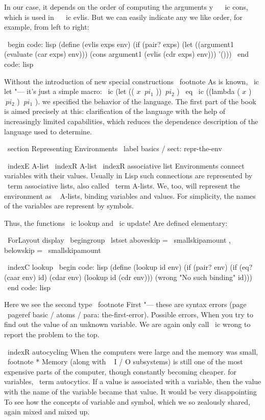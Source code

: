 {In our case, it depends on the order of computing the arguments y ~ \ ic {cons}, which
is used in ~ \ ic {evlis}. But we can easily indicate any we like
order, for example, from left to right:

\ begin {code: lisp}
(define (evlis exps env)
  (if (pair? exps)
      (let ((argument1 (evaluate (car exps) env)))
        (cons argument1 (evlis (cdr exps) env)))
      '()))
\ end {code: lisp}

Without the introduction of new special constructions \ footnote {As is known, \ ic {let} "---
it's just a simple macro: \ ic {(let (( $ x $  $ \ pi _ 1 $ )) $ \ pi _ 2 $ )} { \ eq }
\ ic {((lambda ( $ x $ ) $ \ pi _ 2 $ ) $ \ pi _ 1 $ )}.} we specified the behavior of the
language. The first part of the book is aimed precisely at this: clarification of the
language with the help of increasingly limited capabilities, which reduces the dependence
description of the language used to determine.


\ section {Representing Environments} \ label {basics / sect: repr-the-env}

\ indexE {A-list} \ indexR {A-list}
\ indexR {associative list}
Environments connect variables with their values. Usually in Lisp such connections
are represented by \ term {associative lists}, also called
\ term {A-lists}. We, too, will represent the environment as ~ A-lists,
binding variables and values. For simplicity, the names of the variables are
represent by symbols.

Thus, the functions \ ic {lookup} and \ ic {update!} Are defined elementary:

\ ForLayout {display} { \ begingroup
\ lstset {aboveskip = \ smallskipamount , belowskip = \ smallskipamount }}

\ indexC {lookup}
\ begin {code: lisp}
(define (lookup id env)
  (if (pair? env)
      (if (eq? (caar env) id)
          (cdar env)
          (lookup id (cdr env)))
      (wrong "No such binding" id)))
\ end {code: lisp}

Here we see the second type \ footnote {First "--- these are syntax errors
(page ~ \ pageref {basic / atoms / para: the-first-error}).} Possible errors,
When you try to find out the value of an unknown variable. We are again only
call \ ic {wrong} to report the problem to the top.

\ indexR {autocycling}
When the computers were large and the memory was small, \ footnote * {Memory
(along with ~ I / O subsystems) is still one of the most expensive
parts of the computer, though constantly becoming cheaper.} for variables,
\ term {autocytics}. If a value is associated with a variable,
then the value with the name of the variable became that value. It would be very disappointing
To see how the concepts of variable and symbol, which we so zealously shared,
again mixed and mixed up.

}
